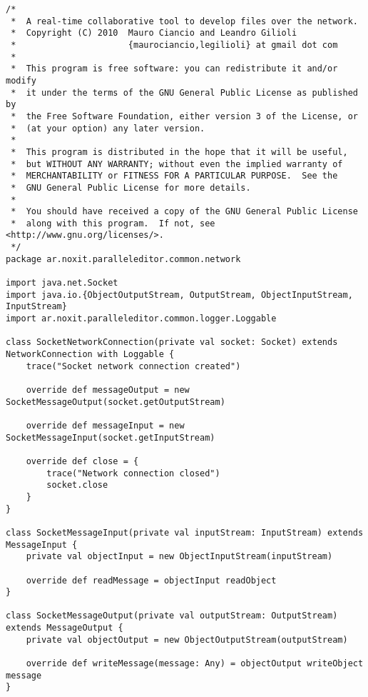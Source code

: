 {
\tiny
\begin{verbatim}
/*
 *  A real-time collaborative tool to develop files over the network.
 *  Copyright (C) 2010  Mauro Ciancio and Leandro Gilioli
 *                      {maurociancio,legilioli} at gmail dot com
 *
 *  This program is free software: you can redistribute it and/or modify
 *  it under the terms of the GNU General Public License as published by
 *  the Free Software Foundation, either version 3 of the License, or
 *  (at your option) any later version.
 *
 *  This program is distributed in the hope that it will be useful,
 *  but WITHOUT ANY WARRANTY; without even the implied warranty of
 *  MERCHANTABILITY or FITNESS FOR A PARTICULAR PURPOSE.  See the
 *  GNU General Public License for more details.
 *
 *  You should have received a copy of the GNU General Public License
 *  along with this program.  If not, see <http://www.gnu.org/licenses/>.
 */
package ar.noxit.paralleleditor.common.network

import java.net.Socket
import java.io.{ObjectOutputStream, OutputStream, ObjectInputStream, InputStream}
import ar.noxit.paralleleditor.common.logger.Loggable

class SocketNetworkConnection(private val socket: Socket) extends NetworkConnection with Loggable {
    trace("Socket network connection created")

    override def messageOutput = new SocketMessageOutput(socket.getOutputStream)

    override def messageInput = new SocketMessageInput(socket.getInputStream)

    override def close = {
        trace("Network connection closed")
        socket.close
    }
}

class SocketMessageInput(private val inputStream: InputStream) extends MessageInput {
    private val objectInput = new ObjectInputStream(inputStream)

    override def readMessage = objectInput readObject
}

class SocketMessageOutput(private val outputStream: OutputStream) extends MessageOutput {
    private val objectOutput = new ObjectOutputStream(outputStream)

    override def writeMessage(message: Any) = objectOutput writeObject message
}\end{verbatim}
}